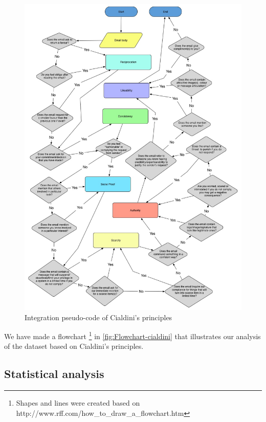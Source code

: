 \begin{figure}[H]
\begin{centering}
\includegraphics[scale=0.4]{gfx/pseudo-cialdini-2}
\par\end{centering}

\protect\caption{\label{fig:Flowchart-cialdini}Integration pseudo-code of Cialdini's
principles}
\end{figure}


We have made a flowchart%
\footnote{Shapes and lines were created based on http://www.rff.com/how\_to\_draw\_a\_flowchart.htm%
} in \autoref{fig:Flowchart-cialdini} that illustrates our analysis
of the dataset based on Cialdini's principles. 


\subsection{Statistical analysis}

